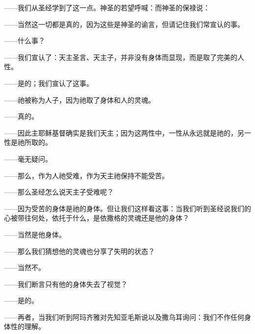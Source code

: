 ——我们从圣经学到了这一点。神圣的若望呼喊：而神圣的保禄说：\par

——当然这一切都是真的，因为这些是神圣的谕言，但请记住我们常宣认的事。\par

——什么事？\par

——我们宣认了：天主圣言、天主子，并非没有身体而显现，而是取了完美的人性。\par

——是的；我们宣认了这事。\par

——祂被称为人子，因为祂取了身体和人的灵魂。\par

——真的。\par

——因此主耶稣基督确实是我们天主；因为这两性中，一性从永远就是祂的，另一性是祂所取的。\par

——毫无疑问。\par

——那么，作为人祂受难，作为天主祂保持不能受苦。\par

——那么圣经怎么说天主子受难呢？\par

——因为受苦的身体是祂的身体。但让我们这样看这事：当我们听到圣经说我们的心被带往何处，依托于什么，是依撒格的灵魂还是他的身体？\par

——当然是他身体。\par

——那么我们猜想他的灵魂也分享了失明的状态？\par

——当然不。\par

——我们断言只有他的身体失去了视觉？\par

——是的。\par

——再者，当我们听到阿玛齐雅对先知亚毛斯说以及撒乌耳询问：我们不作任何身体性的理解。\par


